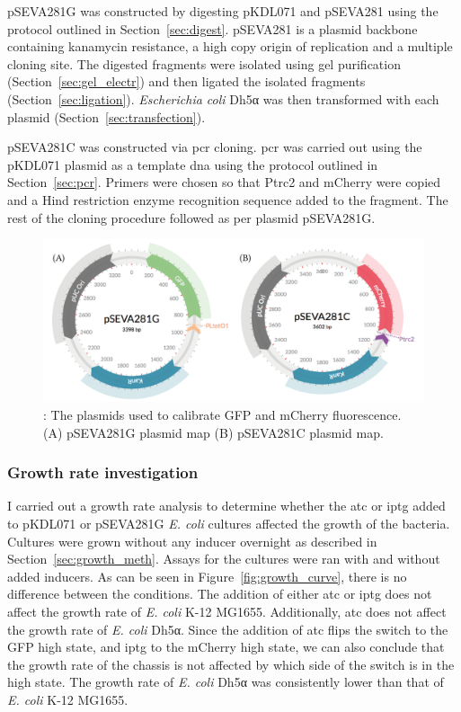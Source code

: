 pSEVA281G was constructed by digesting pKDL071 and pSEVA281 using the protocol outlined in Section~\ref{sec:digest}. pSEVA281 is a plasmid backbone containing kanamycin resistance, a high copy origin of replication and a multiple cloning site. The digested fragments were isolated using gel purification (Section~\ref{sec:gel_electr}) and then ligated the isolated fragments (Section~\ref{sec:ligation}). \textit{Escherichia coli} Dh5α was then transformed with each plasmid (Section~\ref{sec:transfection}). 

pSEVA281C was constructed via \acrshort{pcr} cloning. \acrshort{pcr} was carried out using the pKDL071 plasmid as a template \acrshort{dna} using the protocol outlined in Section~\ref{sec:pcr}. Primers were chosen so that Ptrc2 and mCherry were copied and a Hind restriction enzyme recognition sequence added to the fragment. The rest of the cloning procedure followed as per plasmid pSEVA281G.

\begin{figure}[tb]
	\begin{center}
		\includegraphics[width=\textwidth]{../../chapters/chapterABCFlow/images/plasmids_constructed.png}
		\caption[LoF caption]{\label{fig:psevas}: The plasmids used to calibrate GFP and mCherry fluorescence. (A) pSEVA281G plasmid map (B) pSEVA281C plasmid map.  }
	\end{center}
\end{figure}


\subsubsection{Growth rate investigation}

I carried out a growth rate analysis to determine whether the \acrshort{atc} or \acrshort{iptg} added to pKDL071 or pSEVA281G \textit{E. coli} cultures affected the growth of the bacteria. Cultures were grown without any inducer overnight as described in Section~\ref{sec:growth_meth}. Assays for the cultures were ran with and without added inducers. As can be seen in Figure~\ref{fig:growth_curve}, there is no difference between the conditions. The addition of either \acrshort{atc} or \acrshort{iptg} does not affect the growth rate of \textit{E. coli} K-12 MG1655. Additionally, \acrshort{atc} does not affect the growth rate of \textit{E. coli} Dh5α. Since the addition of \acrshort{atc} flips the switch to the GFP high state, and \acrshort{iptg} to the mCherry high state, we can also conclude that the growth rate of the chassis is not affected by which side of the switch is in the high state. The growth rate of \textit{E. coli} Dh5α was consistently lower than that of \textit{E. coli} K-12 MG1655.

